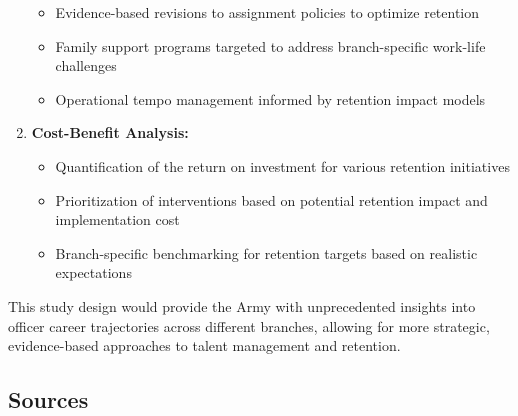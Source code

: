 \documentclass[
  letterpaper,
  DIV=11,
  numbers=noendperiod]{scrartcl}
\providecommand{\tightlist}{%
  \setlength{\itemsep}{0pt}\setlength{\parskip}{0pt}}
\begin{document}
\begin{enumerate}
  \begin{itemize}
  \tightlist
  \item
    Evidence-based revisions to assignment policies to optimize
    retention
  \item
    Family support programs targeted to address branch-specific
    work-life challenges
  \item
    Operational tempo management informed by retention impact models
  \end{itemize}
\item
  \textbf{Cost-Benefit Analysis:}

  \begin{itemize}
  \tightlist
  \item
    Quantification of the return on investment for various retention
    initiatives
  \item
    Prioritization of interventions based on potential retention impact
    and implementation cost
  \item
    Branch-specific benchmarking for retention targets based on
    realistic expectations
  \end{itemize}
\end{enumerate}

This study design would provide the Army with unprecedented insights
into officer career trajectories across different branches, allowing for
more strategic, evidence-based approaches to talent management and
retention.

\subsection{Sources}\label{sources}
\end{document}
